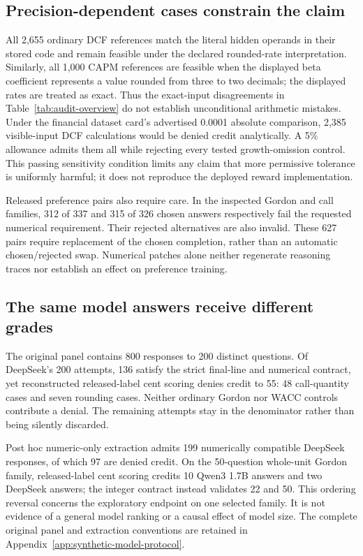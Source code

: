\subsection{Precision-dependent cases constrain the claim}
All 2,655 ordinary DCF references match the literal hidden operands in their stored code and remain feasible under the declared rounded-rate interpretation. Similarly, all 1,000 CAPM references are feasible when the displayed beta coefficient represents a value rounded from three to two decimals; the displayed rates are treated as exact. Thus the exact-input disagreements in Table~\ref{tab:audit-overview} do not establish unconditional arithmetic mistakes. Under the financial dataset card's advertised 0.0001 absolute comparison, 2,385 visible-input DCF calculations would be denied credit analytically. A 5\% allowance admits them all while rejecting every tested growth-omission control. This passing sensitivity condition limits any claim that more permissive tolerance is uniformly harmful; it does not reproduce the deployed reward implementation.

Released preference pairs also require care. In the inspected Gordon and call families, 312 of 337 and 315 of 326 chosen answers respectively fail the requested numerical requirement. Their rejected alternatives are also invalid. These 627 pairs require replacement of the chosen completion, rather than an automatic chosen/rejected swap. Numerical patches alone neither regenerate reasoning traces nor establish an effect on preference training.

\subsection{The same model answers receive different grades}
The original panel contains 800 responses to 200 distinct questions. Of DeepSeek's 200 attempts, 136 satisfy the strict final-line and numerical contract, yet reconstructed released-label cent scoring denies credit to 55: 48 call-quantity cases and seven rounding cases. Neither ordinary Gordon nor WACC controls contribute a denial. The remaining attempts stay in the denominator rather than being silently discarded.

Post hoc numeric-only extraction admits 199 numerically compatible DeepSeek responses, of which 97 are denied credit. On the 50-question whole-unit Gordon family, released-label cent scoring credits 10 Qwen3 1.7B answers and two DeepSeek answers; the integer contract instead validates 22 and 50. This ordering reversal concerns the exploratory endpoint on one selected family. It is not evidence of a general model ranking or a causal effect of model size. The complete original panel and extraction conventions are retained in Appendix~\ref{app:synthetic-model-protocol}.


